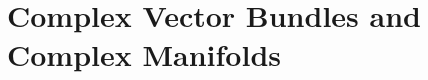 \documentclass[../main]{subfiles}
\begin{document}
\chapter{Complex Vector Bundles and Complex Manifolds}\label{ch:13}

\end{document}
